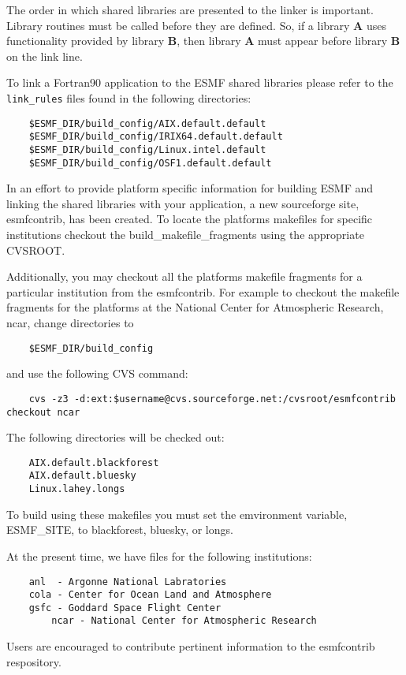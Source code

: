 The order in which shared libraries are presented to 
the linker is important. Library routines must be called before they are 
defined. So, if a library {\bf A} uses functionality provided by library 
{\bf B}, then library {\bf A} must appear before library {\bf B} on the link line. 

To link a Fortran90 application to the ESMF shared libraries please refer to the
{\tt link\_rules} files found in the following directories:


\begin{verbatim}
	$ESMF_DIR/build_config/AIX.default.default
	$ESMF_DIR/build_config/IRIX64.default.default
	$ESMF_DIR/build_config/Linux.intel.default
	$ESMF_DIR/build_config/OSF1.default.default
\end{verbatim}

In an effort to provide platform specific information for building ESMF and linking the
shared libraries with your application, a new sourceforge site, esmfcontrib, has been created.
To locate the platforms makefiles for specific institutions checkout the build\_makefile\_fragments
using the appropriate CVSROOT.

Additionally, you may checkout all the platforms makefile fragments for a particular institution
from the esmfcontrib. For example to checkout the makefile fragments for the platforms at the
National Center for Atmospheric Research, ncar, change directories to

\begin{verbatim}
 	$ESMF_DIR/build_config
\end{verbatim}

and use the following CVS command:

\begin{verbatim}
	cvs -z3 -d:ext:$username@cvs.sourceforge.net:/cvsroot/esmfcontrib checkout ncar
\end{verbatim}

The following directories will be checked out:

\begin{verbatim}
	AIX.default.blackforest
	AIX.default.bluesky
	Linux.lahey.longs
\end{verbatim}

To build using these makefiles you must set the emvironment variable, ESMF\_SITE, to blackforest, bluesky, or longs.

At the present time, we have files for the following institutions:

\begin{verbatim}
	anl  - Argonne National Labratories
	cola - Center for Ocean Land and Atmosphere
	gsfc - Goddard Space Flight Center
        ncar - National Center for Atmospheric Research
\end{verbatim}


Users are encouraged to contribute pertinent information to the esmfcontrib respository.




